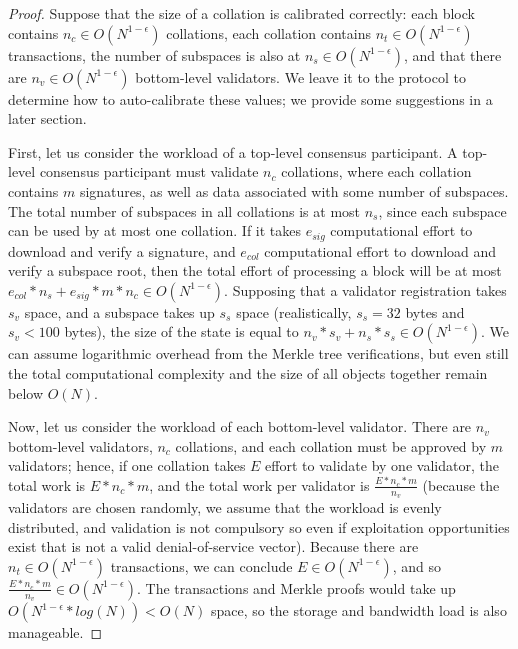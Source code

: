 \documentclass[11pt,a4paper]{article}
\theoremstyle{plain}
\theoremstyle{definition}
\theoremstyle{remark}
\begin{document}
\begin{proof}
Suppose that the size of a collation is calibrated correctly: each block contains $n_c \in O(N^{1-\epsilon})$ collations, each collation contains $n_t \in O(N^{1-\epsilon})$ transactions, the number of subspaces is also at $n_s \in O(N^{1-\epsilon})$, and that there are $n_v \in O(N^{1-\epsilon})$ bottom-level validators. We leave it to the protocol to determine how to auto-calibrate these values; we provide some suggestions in a later section.

First, let us consider the workload of a top-level consensus participant. A top-level consensus participant must validate $n_c$ collations, where each collation contains $m$ signatures, as well as data associated with some number of subspaces. The total number of subspaces in all collations is at most $n_s$, since each subspace can be used by at most one collation. If it takes $e_{sig}$ computational effort to download and verify a signature, and $e_{col}$ computational effort to download and verify a subspace root, then the total effort of processing a block will be at most $e_{col} * n_s + e_{sig} * m * n_c \in O(N^{1-\epsilon})$. Supposing that a validator registration takes $s_v$ space, and a subspace takes up $s_s$ space (realistically, $s_s = 32$ bytes and $s_v < 100$ bytes), the size of the state is equal to $n_v * s_v + n_s * s_s \in O(N^{1-\epsilon})$. We can assume logarithmic overhead from the Merkle tree verifications, but even still the total computational complexity and the size of all objects together remain below $O(N)$.

Now, let us consider the workload of each bottom-level validator. There are $n_v$ bottom-level validators, $n_c$ collations, and each collation must be approved by $m$ validators; hence, if one collation takes $E$ effort to validate by one validator, the total work is $E * n_c * m$, and the total work per validator is $\frac{E * n_c * m}{n_v}$ (because the validators are chosen randomly, we assume that the workload is evenly distributed, and validation is not compulsory so even if exploitation opportunities exist that is not a valid denial-of-service vector). Because there are $n_t \in O(N^{1-\epsilon})$ transactions, we can conclude $E \in O(N^{1-\epsilon})$, and so $\frac{E * n_c * m}{n_v} \in O(N^{1-\epsilon})$. The transactions and Merkle proofs would take up $O(N^{1-\epsilon} * log(N)) < O(N)$ space, so the storage and bandwidth load is also manageable.
\end{proof}
\end{document}
